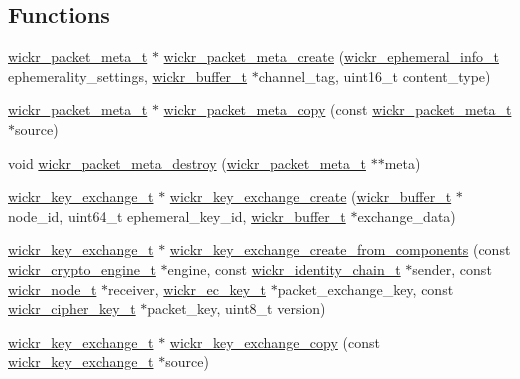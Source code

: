 \subsection*{Functions}
\begin{DoxyCompactItemize}
\item 
\hyperlink{structwickr__packet__meta}{wickr\+\_\+packet\+\_\+meta\+\_\+t} $\ast$ \hyperlink{group__wickr__protocol_ga146144d74da12c1fff766462fe7fa661}{wickr\+\_\+packet\+\_\+meta\+\_\+create} (\hyperlink{structwickr__ephemeral__info}{wickr\+\_\+ephemeral\+\_\+info\+\_\+t} ephemerality\+\_\+settings, \hyperlink{structwickr__buffer}{wickr\+\_\+buffer\+\_\+t} $\ast$channel\+\_\+tag, uint16\+\_\+t content\+\_\+type)
\item 
\hyperlink{structwickr__packet__meta}{wickr\+\_\+packet\+\_\+meta\+\_\+t} $\ast$ \hyperlink{group__wickr__protocol_ga1bb5a0f2a49069679b174b3e6521fe9b}{wickr\+\_\+packet\+\_\+meta\+\_\+copy} (const \hyperlink{structwickr__packet__meta}{wickr\+\_\+packet\+\_\+meta\+\_\+t} $\ast$source)
\item 
void \hyperlink{group__wickr__protocol_gad165ad670da761478cf5f8f91223c1d3}{wickr\+\_\+packet\+\_\+meta\+\_\+destroy} (\hyperlink{structwickr__packet__meta}{wickr\+\_\+packet\+\_\+meta\+\_\+t} $\ast$$\ast$meta)
\item 
\hyperlink{structwickr__key__exchange}{wickr\+\_\+key\+\_\+exchange\+\_\+t} $\ast$ \hyperlink{group__wickr__protocol_gac2823b3430070b0db9ef1f40d3a804ea}{wickr\+\_\+key\+\_\+exchange\+\_\+create} (\hyperlink{structwickr__buffer}{wickr\+\_\+buffer\+\_\+t} $\ast$node\+\_\+id, uint64\+\_\+t ephemeral\+\_\+key\+\_\+id, \hyperlink{structwickr__buffer}{wickr\+\_\+buffer\+\_\+t} $\ast$exchange\+\_\+data)
\item 
\hyperlink{structwickr__key__exchange}{wickr\+\_\+key\+\_\+exchange\+\_\+t} $\ast$ \hyperlink{group__wickr__protocol_gae031f68d2286e0399d90b0316a7d5299}{wickr\+\_\+key\+\_\+exchange\+\_\+create\+\_\+from\+\_\+components} (const \hyperlink{structwickr__crypto__engine}{wickr\+\_\+crypto\+\_\+engine\+\_\+t} $\ast$engine, const \hyperlink{structwickr__identity__chain}{wickr\+\_\+identity\+\_\+chain\+\_\+t} $\ast$sender, const \hyperlink{structwickr__node}{wickr\+\_\+node\+\_\+t} $\ast$receiver, \hyperlink{structwickr__ec__key}{wickr\+\_\+ec\+\_\+key\+\_\+t} $\ast$packet\+\_\+exchange\+\_\+key, const \hyperlink{structwickr__cipher__key}{wickr\+\_\+cipher\+\_\+key\+\_\+t} $\ast$packet\+\_\+key, uint8\+\_\+t version)
\item 
\hyperlink{structwickr__key__exchange}{wickr\+\_\+key\+\_\+exchange\+\_\+t} $\ast$ \hyperlink{group__wickr__protocol_ga2235a7c168e3806aa1a71b5a5c8dee48}{wickr\+\_\+key\+\_\+exchange\+\_\+copy} (const \hyperlink{structwickr__key__exchange}{wickr\+\_\+key\+\_\+exchange\+\_\+t} $\ast$source)
$$
\end{DoxyCompactItemize}
